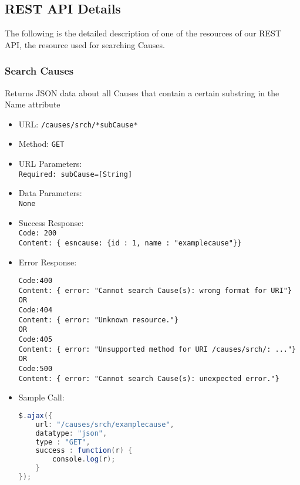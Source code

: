 \subsection{REST API Details}

The following is the detailed description of one of the resources of our REST API, the resource used for searching Causes.

\subsubsection*{Search Causes}


Returns JSON data about all Causes that contain a certain substring in the Name attribute 


\begin{itemize}
    \item URL: \texttt{/causes/srch/*subCause*}
    \item Method: \texttt{GET}
    \item URL Parameters: \texttt{\\Required: subCause=[String] }
    \item Data Parameters: \texttt{\\None}
    \item Success Response: \texttt{\\Code: 200 \\Content: \{ esncause: \{id : 1, name : "examplecause"\}\}} 
    \item Error Response:
    \begin{verbatim}
Code:400
Content: { error: "Cannot search Cause(s): wrong format for URI"}
OR
Code:404
Content: { error: "Unknown resource."}
OR
Code:405
Content: { error: "Unsupported method for URI /causes/srch/: ..."}
OR
Code:500
Content: { error: "Cannot search Cause(s): unexpected error."}
    \end{verbatim}
    \item Sample Call: \begin{lstlisting}[language = Java]
$.ajax({
    url: "/causes/srch/examplecause",
    datatype: "json",
    type : "GET",
    success : function(r) {
        console.log(r);
    }
});
    \end{lstlisting}
\end{itemize}

